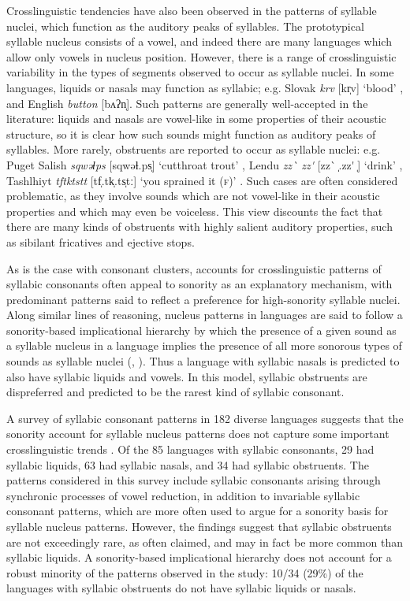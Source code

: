   Crosslinguistic tendencies have also been observed in the patterns of syllable nuclei, which function as the auditory peaks of syllables. The prototypical syllable nucleus consists of a vowel, and indeed there are many languages which allow only vowels in nucleus position. However, there is a range of crosslinguistic variability in the types of segments observed to occur as syllable nuclei. In some languages, liquids or nasals may function as syllabic; e.g. Slovak \textit{krv} [kr̩v] ‘blood’ \citep[186]{Zec2007}, and English \textit{button} [bʌʔn̩]. Such patterns are generally well-accepted in the literature: liquids and nasals are vowel-like in some properties of their acoustic structure, so it is clear how such sounds might function as auditory peaks of syllables. More rarely, obstruents are reported to occur as syllable nuclei: e.g. Puget Salish \textit{sqwəɬps} [sqwəɬ.ps̩] ‘cutthroat trout’ \citep[62]{Hoard1978}, Lendu \textit{zz\`{} zz\'{} } [zz\`{} ̩.zz\'{} ̩] ‘drink’ \citep[483]{Demolin2002}, Tashlhiyt \textit{tftktstt} [tf̩.tk̩.ts̩tː] ‘you sprained it (\textsc{f})’ \citep[332]{Ridouane2008}. Such cases are often considered problematic, as they involve sounds which are not vowel-like in their acoustic properties and which may even be voiceless. This view discounts the fact that there are many kinds of obstruents with highly salient auditory properties, such as sibilant fricatives and ejective stops.

  As is the case with consonant clusters, accounts for crosslinguistic patterns of syllabic consonants often appeal to sonority as an explanatory mechanism, with predominant patterns said to reflect a preference for high-sonority syllable nuclei. Along similar lines of reasoning, nucleus patterns in languages are said to follow a sonority-based implicational hierarchy by which the presence of a given sound as a syllable nucleus in a language implies the presence of all more sonorous types of sounds as syllable nuclei (\citealt{Blevins1995}, \citealt{Zec2007}). Thus a language with syllabic nasals is predicted to also have syllabic liquids and vowels. In this model, syllabic obstruents are dispreferred and predicted to be the rarest kind of syllabic consonant.

  A survey of syllabic consonant patterns in 182 diverse languages suggests that the sonority account for syllable nucleus patterns does not capture some important crosslinguistic trends \citep{Bell1978a}. Of the 85 languages with syllabic consonants, 29 had syllabic liquids, 63 had syllabic nasals, and 34 had syllabic obstruents. The patterns considered in this survey include syllabic consonants arising through synchronic processes of vowel reduction, in addition to invariable syllabic consonant patterns, which are more often used to argue for a sonority basis for syllable nucleus patterns. However, the findings suggest that syllabic obstruents are not exceedingly rare, as often claimed, and may in fact be more common than syllabic liquids. A sonority-based implicational hierarchy does not account for a robust minority of the patterns observed in the study: 10/34 (29\%) of the languages with syllabic obstruents do not have syllabic liquids or nasals.

